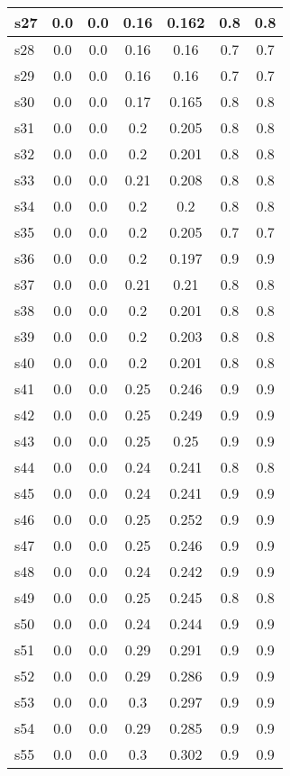 \documentclass{article}
\begin{document}
\begin{tabular}{|l|c|c|c|c|c|c|}
\hline
s27 &0.0 & 0.0 & 0.16 & 0.162 & 0.8 & 0.8\\
\hline
s28 &0.0 & 0.0 & 0.16 & 0.16 & 0.7 & 0.7\\
\hline
s29 &0.0 & 0.0 & 0.16 & 0.16 & 0.7 & 0.7\\
\hline
s30 &0.0 & 0.0 & 0.17 & 0.165 & 0.8 & 0.8\\
\hline
s31 &0.0 & 0.0 & 0.2 & 0.205 & 0.8 & 0.8\\
\hline
s32 &0.0 & 0.0 & 0.2 & 0.201 & 0.8 & 0.8\\
\hline
s33 &0.0 & 0.0 & 0.21 & 0.208 & 0.8 & 0.8\\
\hline
s34 &0.0 & 0.0 & 0.2 & 0.2 & 0.8 & 0.8\\
\hline
s35 &0.0 & 0.0 & 0.2 & 0.205 & 0.7 & 0.7\\
\hline
s36 &0.0 & 0.0 & 0.2 & 0.197 & 0.9 & 0.9\\
\hline
s37 &0.0 & 0.0 & 0.21 & 0.21 & 0.8 & 0.8\\
\hline
s38 &0.0 & 0.0 & 0.2 & 0.201 & 0.8 & 0.8\\
\hline
s39 &0.0 & 0.0 & 0.2 & 0.203 & 0.8 & 0.8\\
\hline
s40 &0.0 & 0.0 & 0.2 & 0.201 & 0.8 & 0.8\\
\hline
s41 &0.0 & 0.0 & 0.25 & 0.246 & 0.9 & 0.9\\
\hline
s42 &0.0 & 0.0 & 0.25 & 0.249 & 0.9 & 0.9\\
\hline
s43 &0.0 & 0.0 & 0.25 & 0.25 & 0.9 & 0.9\\
\hline
s44 &0.0 & 0.0 & 0.24 & 0.241 & 0.8 & 0.8\\
\hline
s45 &0.0 & 0.0 & 0.24 & 0.241 & 0.9 & 0.9\\
\hline
s46 &0.0 & 0.0 & 0.25 & 0.252 & 0.9 & 0.9\\
\hline
s47 &0.0 & 0.0 & 0.25 & 0.246 & 0.9 & 0.9\\
\hline
s48 &0.0 & 0.0 & 0.24 & 0.242 & 0.9 & 0.9\\
\hline
s49 &0.0 & 0.0 & 0.25 & 0.245 & 0.8 & 0.8\\
\hline
s50 &0.0 & 0.0 & 0.24 & 0.244 & 0.9 & 0.9\\
\hline
s51 &0.0 & 0.0 & 0.29 & 0.291 & 0.9 & 0.9\\
\hline
s52 &0.0 & 0.0 & 0.29 & 0.286 & 0.9 & 0.9\\
\hline
s53 &0.0 & 0.0 & 0.3 & 0.297 & 0.9 & 0.9\\
\hline
s54 &0.0 & 0.0 & 0.29 & 0.285 & 0.9 & 0.9\\
\hline
s55 &0.0 & 0.0 & 0.3 & 0.302 & 0.9 & 0.9\\

\end{tabular}
\end{document}
